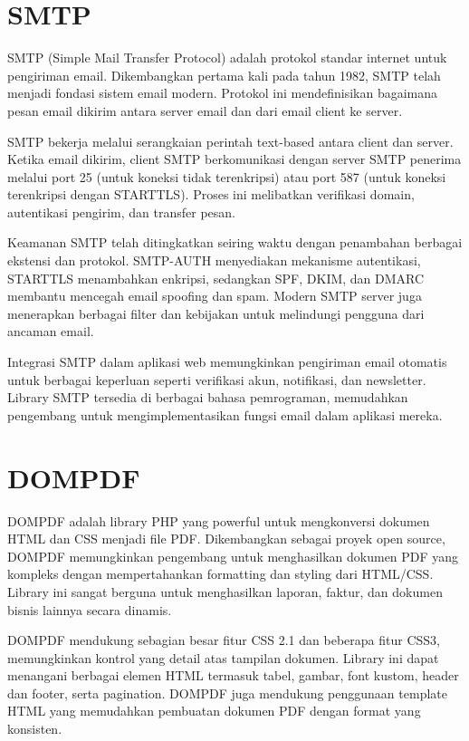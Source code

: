 \documentclass[a4paper,12pt]{report}
\begin{document}
\section{SMTP}
SMTP (Simple Mail Transfer Protocol) adalah protokol standar internet untuk pengiriman email. Dikembangkan pertama kali pada tahun 1982, SMTP telah menjadi fondasi sistem email modern. Protokol ini mendefinisikan bagaimana pesan email dikirim antara server email dan dari email client ke server.

SMTP bekerja melalui serangkaian perintah text-based antara client dan server. Ketika email dikirim, client SMTP berkomunikasi dengan server SMTP penerima melalui port 25 (untuk koneksi tidak terenkripsi) atau port 587 (untuk koneksi terenkripsi dengan STARTTLS). Proses ini melibatkan verifikasi domain, autentikasi pengirim, dan transfer pesan.

Keamanan SMTP telah ditingkatkan seiring waktu dengan penambahan berbagai ekstensi dan protokol. SMTP-AUTH menyediakan mekanisme autentikasi, STARTTLS menambahkan enkripsi, sedangkan SPF, DKIM, dan DMARC membantu mencegah email spoofing dan spam. Modern SMTP server juga menerapkan berbagai filter dan kebijakan untuk melindungi pengguna dari ancaman email.

Integrasi SMTP dalam aplikasi web memungkinkan pengiriman email otomatis untuk berbagai keperluan seperti verifikasi akun, notifikasi, dan newsletter. Library SMTP tersedia di berbagai bahasa pemrograman, memudahkan pengembang untuk mengimplementasikan fungsi email dalam aplikasi mereka.

\section{DOMPDF}
DOMPDF adalah library PHP yang powerful untuk mengkonversi dokumen HTML dan CSS menjadi file PDF. Dikembangkan sebagai proyek open source, DOMPDF memungkinkan pengembang untuk menghasilkan dokumen PDF yang kompleks dengan mempertahankan formatting dan styling dari HTML/CSS. Library ini sangat berguna untuk menghasilkan laporan, faktur, dan dokumen bisnis lainnya secara dinamis.

DOMPDF mendukung sebagian besar fitur CSS 2.1 dan beberapa fitur CSS3, memungkinkan kontrol yang detail atas tampilan dokumen. Library ini dapat menangani berbagai elemen HTML termasuk tabel, gambar, font kustom, header dan footer, serta pagination. DOMPDF juga mendukung penggunaan template HTML yang memudahkan pembuatan dokumen PDF dengan format yang konsisten.
\end{document}
